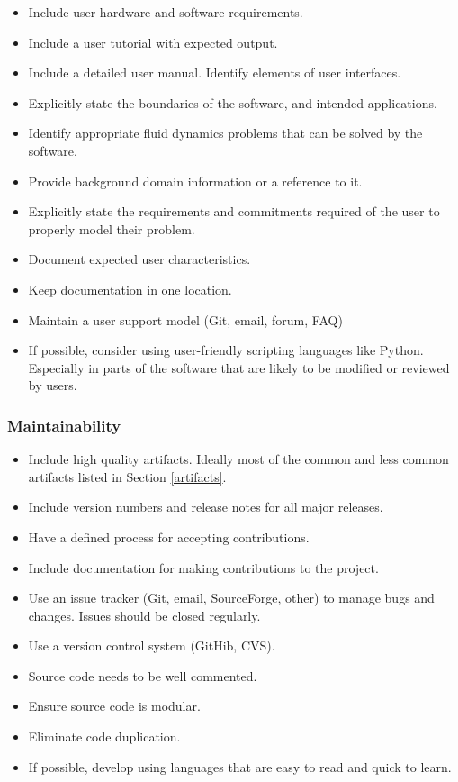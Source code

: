 \documentclass[12pt, notitlepage]{article}
\begin{document}
\begin{itemize}
	\item Include user hardware and software requirements.
	\item Include a user tutorial with expected output.
	\item Include a detailed user manual. Identify elements of user interfaces.
	\item Explicitly state the boundaries of the software, and intended applications.
	\item Identify appropriate fluid dynamics problems that can be solved by the software.
	\item Provide background domain information or a reference to it.
	\item Explicitly state the requirements and commitments required of the user to properly model their problem.
	\item Document expected user characteristics.
	\item Keep documentation in one location.
	\item Maintain a user support model (Git, email, forum, FAQ)
	\item If possible, consider using user-friendly scripting languages like Python. Especially in parts of the software that are likely to be modified or reviewed by users.
\end{itemize}

\subsubsection{Maintainability}

\begin{itemize}
	\item Include high quality artifacts. Ideally most of the common and less common artifacts listed in Section \ref{artifacts}.
	\item Include version numbers and release notes for all major releases. 
	\item Have a defined process for accepting contributions.
	\item Include documentation for making contributions to the project. 
	\item Use an issue tracker (Git, email, SourceForge, other) to manage bugs and changes. Issues should be closed regularly. 
	\item Use a version control system (GitHib, CVS).
	\item Source code needs to be well commented.
	\item Ensure source code is modular.
	\item Eliminate code duplication.
	\item If possible, develop using languages that are easy to read and quick to learn.
\end{itemize}
\end{document}

